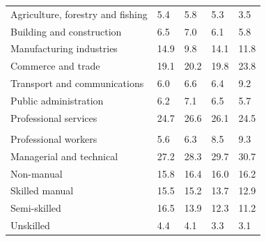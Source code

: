 \documentclass{article}
\begin{document}
\begin{table}[h]
\begin{tabular}{KTTTT}
    \hline
Agriculture, forestry and fishing  & 5.4& 5.8& 5.3& 3.5\\
Building and construction & 6.5& 7.0& 6.1& 5.8\\
Manufacturing industries & 14.9&  9.8& 14.1& 11.8\\
Commerce and trade  & 19.1& 20.2& 19.8& 23.8\\
Transport and communications  & 6.0& 6.6& 6.4& 9.2\\
Public administration & 6.2& 7.1& 6.5& 5.7\\
Professional services & 24.7& 26.6& 26.1& 24.5\\
\hline
    \\ 
    \hline
Professional workers  & 5.6& 6.3 & 8.5& 9.3\\
Managerial and technical & 27.2& 28.3& 29.7& 30.7\\
Non-manual & 15.8& 16.4& 16.0& 16.2\\
Skilled manual & 15.5& 15.2& 13.7& 12.9\\
Semi-skilled & 16.5& 13.9& 12.3& 11.2\\
Unskilled  & 4.4& 4.1& 3.3& 3.1\\
\end{tabular}
\end{table}
\pagebreak
\end{document}
